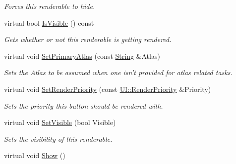 \begin{DoxyCompactItemize}
\begin{DoxyCompactList}\small\item\em Forces this renderable to hide. \item\end{DoxyCompactList}\item 
virtual bool \hyperlink{classMezzanine_1_1UI_1_1BasicRenderable_ad83653b90d57caf95b7de93b9ee31afd}{IsVisible} () const 
\begin{DoxyCompactList}\small\item\em Gets whether or not this renderable is getting rendered. \item\end{DoxyCompactList}\item 
virtual void \hyperlink{classMezzanine_1_1UI_1_1BasicRenderable_aca42d7a5fa95c3190a2204743bd2f659}{SetPrimaryAtlas} (const \hyperlink{namespaceMezzanine_acf9fcc130e6ebf08e3d8491aebcf1c86}{String} \&Atlas)
\begin{DoxyCompactList}\small\item\em Sets the Atlas to be assumed when one isn't provided for atlas related tasks. \item\end{DoxyCompactList}\item 
virtual void \hyperlink{classMezzanine_1_1UI_1_1BasicRenderable_a4391ab57978d558638feb0f7fabefd95}{SetRenderPriority} (const \hyperlink{namespaceMezzanine_1_1UI_ac4c753eb6b5d66350a243acc9ce54130}{UI::RenderPriority} \&Priority)
\begin{DoxyCompactList}\small\item\em Sets the priority this button should be rendered with. \item\end{DoxyCompactList}\item 
virtual void \hyperlink{classMezzanine_1_1UI_1_1BasicRenderable_a03c4b08dcd83ca3b5f3d38e0f43b82ca}{SetVisible} (bool Visible)
\begin{DoxyCompactList}\small\item\em Sets the visibility of this renderable. \item\end{DoxyCompactList}\item 
\hypertarget{classMezzanine_1_1UI_1_1BasicRenderable_ac746146ea693afa9b6345640b5cfd9ef}{
virtual void \hyperlink{classMezzanine_1_1UI_1_1BasicRenderable_ac746146ea693afa9b6345640b5cfd9ef}{Show} ()}
\label{classMezzanine_1_1UI_1_1BasicRenderable_ac746146ea693afa9b6345640b5cfd9ef}


\end{DoxyCompactItemize}
